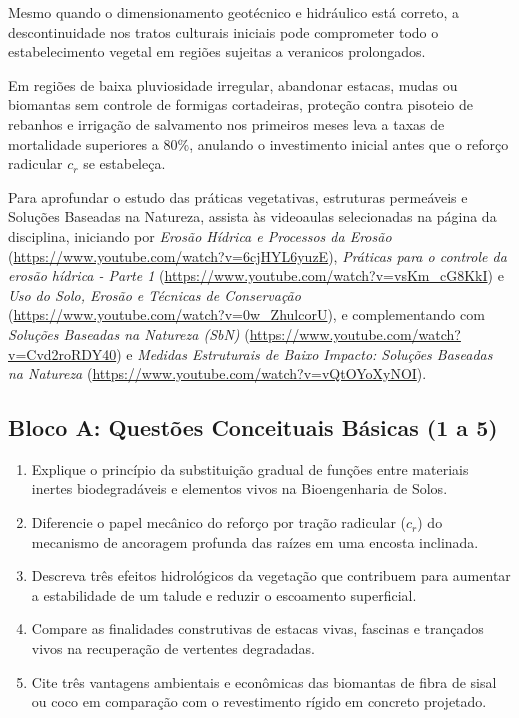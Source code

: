 Mesmo quando o dimensionamento geotécnico e hidráulico está correto, a descontinuidade nos tratos culturais iniciais pode comprometer todo o estabelecimento vegetal em regiões sujeitas a veranicos prolongados.

\begin{boxErro}
Em regiões de baixa pluviosidade irregular, abandonar estacas, mudas ou biomantas sem controle de formigas cortadeiras, proteção contra pisoteio de rebanhos e irrigação de salvamento nos primeiros meses leva a taxas de mortalidade superiores a $80\%$, anulando o investimento inicial antes que o reforço radicular $c_r$ se estabeleça.
\end{boxErro}

Para aprofundar o estudo das práticas vegetativas, estruturas permeáveis e Soluções Baseadas na Natureza, assista às videoaulas selecionadas na página da disciplina, iniciando por \textit{Erosão Hídrica e Processos da Erosão} (\url{https://www.youtube.com/watch?v=6cjHYL6yuzE}), \textit{Práticas para o controle da erosão hídrica - Parte 1} (\url{https://www.youtube.com/watch?v=vsKm_cG8KkI}) e \textit{Uso do Solo, Erosão e Técnicas de Conservação} (\url{https://www.youtube.com/watch?v=0w_ZhulcorU}), e complementando com \textit{Soluções Baseadas na Natureza (SbN)} (\url{https://www.youtube.com/watch?v=Cvd2roRDY40}) e \textit{Medidas Estruturais de Baixo Impacto: Soluções Baseadas na Natureza} (\url{https://www.youtube.com/watch?v=vQtOYoXyNOI}).


\subsection*{Bloco A: Questões Conceituais Básicas (1 a 5)}
\begin{enumerate}[leftmargin=1.8em, itemsep=6pt]
  \item Explique o princípio da substituição gradual de funções entre materiais inertes biodegradáveis e elementos vivos na Bioengenharia de Solos.
  \espacoResolucao[1.8cm]

  \item Diferencie o papel mecânico do reforço por tração radicular ($c_r$) do mecanismo de ancoragem profunda das raízes em uma encosta inclinada.
  \espacoResolucao[1.8cm]

  \item Descreva três efeitos hidrológicos da vegetação que contribuem para aumentar a estabilidade de um talude e reduzir o escoamento superficial.
  \espacoResolucao[1.8cm]

  \item Compare as finalidades construtivas de estacas vivas, fascinas e trançados vivos na recuperação de vertentes degradadas.
  \espacoResolucao[1.8cm]

  \item Cite três vantagens ambientais e econômicas das biomantas de fibra de sisal ou coco em comparação com o revestimento rígido em concreto projetado.
  \espacoResolucao[1.8cm]
\end{enumerate}

